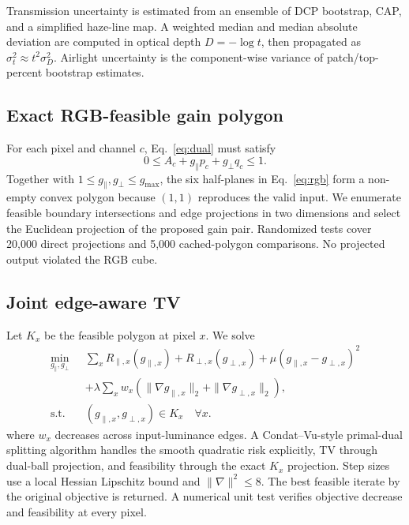 \documentclass[10pt,twocolumn]{article}
\begin{document}
Transmission uncertainty is estimated from an ensemble of DCP bootstrap, CAP, and a simplified
haze-line map. A weighted median and median absolute deviation are computed in optical depth
$D=-\log t$, then propagated as $\sigma_t^2\approx t^2\sigma_D^2$. Airlight uncertainty is the
component-wise variance of patch/top-percent bootstrap estimates.

\subsection{Exact RGB-feasible gain polygon}
For each pixel and channel $c$, Eq.~\eqref{eq:dual} must satisfy
\begin{equation}
 0\le A_c+g_{\parallel}p_c+g_{\perp}q_c\le1.
 \label{eq:rgb}
\end{equation}
Together with $1\le g_{\parallel},g_{\perp}\le g_{\max}$, the six half-planes in
Eq.~\eqref{eq:rgb} form a non-empty convex polygon because $(1,1)$ reproduces the valid input.
We enumerate feasible boundary intersections and edge projections in two dimensions and select the
Euclidean projection of the proposed gain pair. Randomized tests cover 20,000 direct projections
and 5,000 cached-polygon comparisons. No projected output violated the RGB cube.

\subsection{Joint edge-aware TV}
Let $K_x$ be the feasible polygon at pixel $x$. We solve
\begin{align}
 \min_{g_\parallel,g_\perp}\;&\sum_x R_{\parallel,x}(g_{\parallel,x})+
 R_{\perp,x}(g_{\perp,x})+\mu(g_{\parallel,x}-g_{\perp,x})^2 \nonumber\\
 &+\lambda\sum_x w_x\left(\|\nabla g_{\parallel,x}\|_2+
 \|\nabla g_{\perp,x}\|_2\right),
 \label{eq:joint}\\
 \text{s.t.}\quad &(g_{\parallel,x},g_{\perp,x})\in K_x\quad\forall x.\nonumber
\end{align}
where $w_x$ decreases across input-luminance edges. A Condat--Vu-style primal-dual splitting
algorithm \cite{condat2013} handles the smooth quadratic risk explicitly, TV through dual-ball
projection, and feasibility through the exact $K_x$ projection. Step sizes use a local Hessian
Lipschitz bound and $\|\nabla\|^2\le8$. The best feasible iterate by the original objective is
returned. A numerical unit test verifies objective decrease and feasibility at every pixel.
\end{document}
